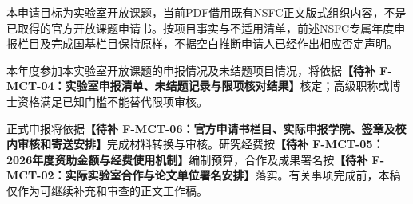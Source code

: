 \justifying
\NSFCBodyText

本申请目标为实验室开放课题，当前PDF借用既有NSFC正文版式组织内容，不是已取得的官方开放课题申请书。按项目事实与不适用清单，前述NSFC专属年度申报栏目及完成国基栏目保持原样，不据空白推断申请人已经作出相应否定声明。

本年度参加本实验室开放课题的申报情况及未结题项目情况，将依据\textbf{【待补 F-MCT-04：实验室申报清单、未结题记录与限项核对结果】}核定；高级职称或博士资格满足已知门槛不能替代限项审核。

正式申报将依据\textbf{【待补 F-MCT-06：官方申请书栏目、实际申报学院、签章及校内审核和寄送安排】}完成材料转换与审核。研究经费按\textbf{【待补 F-MCT-05：2026年度资助金额与经费使用机制】}编制预算，合作及成果署名按\textbf{【待补 F-MCT-02：实际实验室合作与论文单位署名安排】}落实。有关事项完成前，本稿仅作为可继续补充和审查的正文工作稿。
